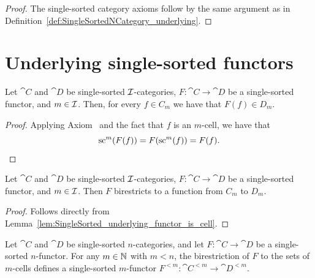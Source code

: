 \begin{proof}
  \leanok
  The single-sorted category axioms follow by the same argument as in
  Definition~\ref{def:SingleSortedNCategory_underlying}.
\end{proof}

\section{Underlying single-sorted functors}

\begin{lemma}
  \label{lem:SingleSorted_underlying_functor_is_cell}
  \leanok
  Let $\cat{C}$ and $\cat{D}$ be single-sorted $\mathcal{I}$-categories, $F \colon \cat{C} \to \cat{D}$
  be a single-sorted functor, and $m \in \mathcal{I}$. Then, for every $f \in C_m$ we have that $F(f) \in
  D_m$.
\end{lemma}

\begin{proof}
  \leanok
  Applying Axiom~ and the fact that $f$ is an
  $m$-cell, we have that
  \[
    \operatorname{sc}^m (F(f)) = F(\operatorname{sc}^m (f)) = F(f).
  \]
\end{proof}

\begin{corollary}
  \label{cor:SingleSorted_underlying_functor_birestriction}
  \leanok
  Let $\cat{C}$ and $\cat{D}$ be single-sorted $\mathcal{I}$-categories, $F \colon \cat{C} \to \cat{D}$
  be a single-sorted functor, and $m \in \mathcal{I}$. Then $F$ birestricts to a function from $C_m$ to
  $D_m$.
\end{corollary}

\begin{proof}
  \leanok
  Follows directly from Lemma~\ref{lem:SingleSorted_underlying_functor_is_cell}.
\end{proof}

\begin{construction}
  \label{def:SingleSortedNFunctor_underlying}
  \leanok
  Let $\cat{C}$ and $\cat{D}$ be single-sorted $n$-categories, and let $F \colon \cat{C} \to
  \cat{D}$ be a single-sorted $n$-functor. For any $m \in \mathbb{N}$ with $m < n$, the birestriction of
  $F$ to the sets of $m$-cells defines a single-sorted $m$-functor $F^{<m} \colon \cat{C}^{<m} \to
  \cat{D}^{<m}$.
\end{construction}

